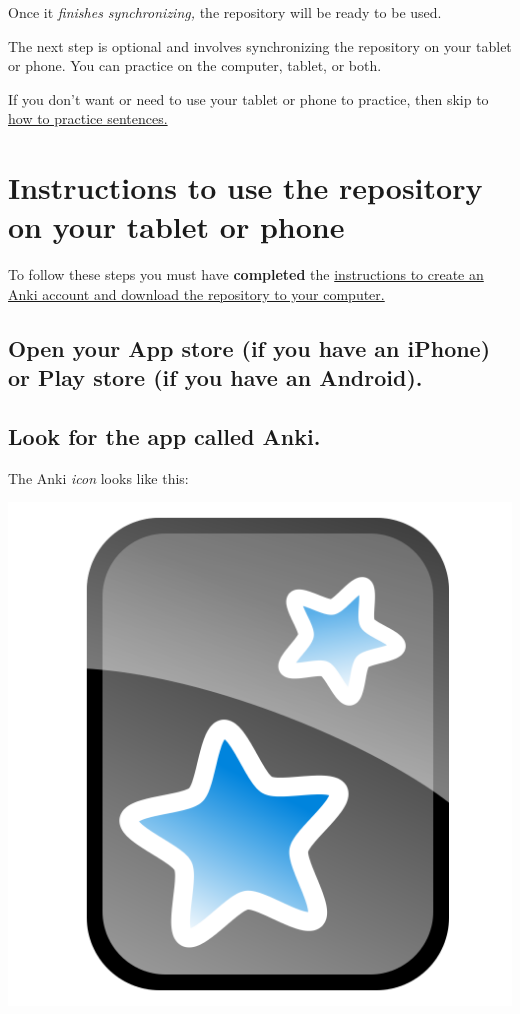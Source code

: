 \documentclass[
]{book}
\begin{document}
Once it \emph{finishes synchronizing,} the repository will be ready to be used.

The next step is optional and involves synchronizing the repository on your tablet or phone. You can practice on the computer, tablet, or both.

If you don't want or need to use your tablet or phone to practice, then skip to \protect\hyperlink{cross_5}{how to practice sentences.}

\hypertarget{instructions-to-use-the-repository-on-your-tablet-or-phone}{%
\chapter{Instructions to use the repository on your tablet or phone}\label{instructions-to-use-the-repository-on-your-tablet-or-phone}}

To follow these steps you must have \textbf{completed} the \protect\hyperlink{cross_3}{instructions to create an Anki account and download the repository to your computer.}

\hypertarget{open-your-app-store-if-you-have-an-iphone-or-play-store-if-you-have-an-android.}{%
\section{Open your App store (if you have an iPhone) or Play store (if you have an Android).}\label{open-your-app-store-if-you-have-an-iphone-or-play-store-if-you-have-an-android.}}

\hypertarget{look-for-the-app-called-anki.}{%
\section{Look for the app called Anki.}\label{look-for-the-app-called-anki.}}

The Anki \emph{icon} looks like this:

\includegraphics[width=0.5\linewidth]{images/reposit_en/Anki_logo}
\end{document}

